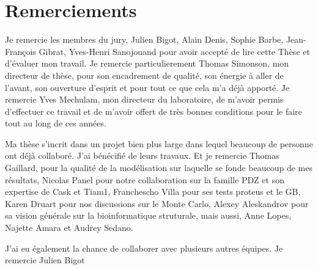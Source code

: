 \chapter*{Remerciements}

Je remercie les membres du jury, Julien Bigot, Alain Denis, Sophie Barbe, Jean-François Gibrat, Yves-Henri Sanojouand pour avoir accepté de lire cette Thèse et d'évaluer mon travail. Je remercie particulierement Thomas Simonson, mon directeur de thèse, pour son encadrement de qualité, son énergie à aller de l'avant, son ouverture d'esprit et pour tout ce que cela m'a déjà apporté. Je remercie Yves Mechulam, mon directeur du laboratoire, de m'avoir permis d'effectuer ce travail et de m'avoir offert de très bonnes conditions pour le faire tout au long de ces années.

Ma thèse s'incrit dans un projet bien plus large dans lequel beaucoup de personne ont déjà collaboré. J'ai bénécifié de leurs travaux. Et je remercie Thomas Gaillard, pour la qualité de la modélisation sur laquelle se fonde beaucoup de mes résultats, Nicolas Panel pour notre collaboration sur la famille PDZ et son expertise de Cask et Tiam1, Franchescho Villa pour ses tests proteus et le GB, Karen Druart pour nos discussions sur le Monte Carlo, Alexey Aleskandrov pour sa vision générale sur la bioinformatique struturale, mais aussi, Anne Lopes, Najette Amara et Audrey Sedano.

J'ai eu également la chance de collaborer avec plusieurs autres équipes. Je remercie Julien Bigot 
